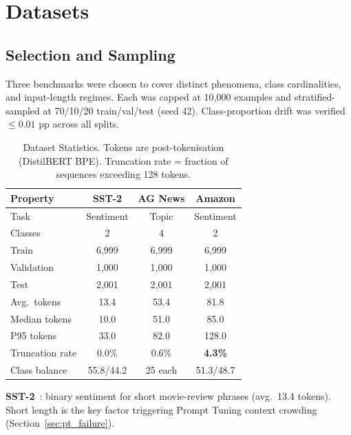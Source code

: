 \documentclass[conference]{IEEEtran}
\begin{document}
\section{Datasets}
\label{sec:datasets}

\subsection{Selection and Sampling}

Three benchmarks were chosen to cover distinct phenomena, class cardinalities, and input-length regimes. Each was capped at 10{,}000 examples and stratified-sampled at 70/10/20 train/val/test (seed 42). Class-proportion drift was verified ${\leq}0.01$ pp across all splits.

\begin{table}[ht]
\centering
\caption{Dataset Statistics. Tokens are post-tokenisation (DistilBERT BPE). Truncation rate = fraction of sequences exceeding 128 tokens.}
\label{tab:datasets}
\renewcommand{\arraystretch}{1.25}
\begin{tabular}{lccc}
\toprule
\textbf{Property} & \textbf{SST-2} & \textbf{AG News} & \textbf{Amazon}\\
\midrule
Task        & Sentiment & Topic    & Sentiment\\
Classes     & 2         & 4        & 2\\
Train       & 6{,}999   & 6{,}999  & 6{,}999\\
Validation  & 1{,}000   & 1{,}000  & 1{,}000\\
Test        & 2{,}001   & 2{,}001  & 2{,}001\\
Avg.\ tokens    & 13.4  & 53.4     & 81.8\\
Median tokens   & 10.0  & 51.0     & 85.0\\
P95 tokens      & 33.0  & 82.0     & 128.0\\
Truncation rate & 0.0\% & 0.6\%    & \textbf{4.3\%}\\
Class balance & 55.8/44.2 & 25 each & 51.3/48.7\\
\bottomrule
\end{tabular}
\end{table}

\textbf{SST-2}~\cite{socher2013recursive}: binary sentiment for short movie-review phrases (avg.\ 13.4 tokens). Short length is the key factor triggering Prompt Tuning context crowding (Section~\ref{sec:pt_failure}).
\end{document}
